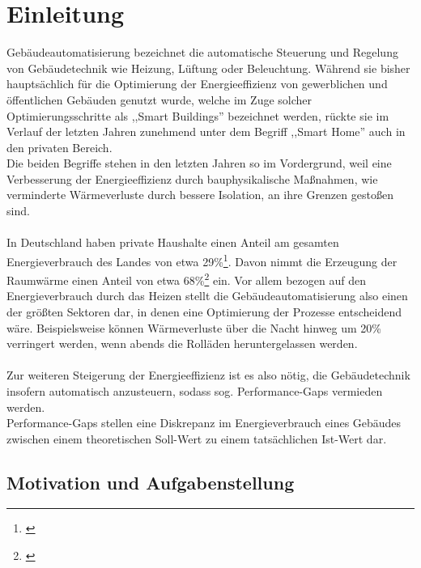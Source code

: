 \clearpage
\chapter{\textbf{Einleitung}}\label{einleitung}



Gebäudeautomatisierung bezeichnet die automatische Steuerung und Regelung von Gebäudetechnik 
wie Heizung, Lüftung oder Beleuchtung. Während sie bisher hauptsächlich für die Optimierung 
der Energieeffizienz von gewerblichen und öffentlichen Gebäuden genutzt wurde, welche im 
Zuge solcher Optimierungsschritte als ,,Smart Buildings'' bezeichnet werden, 
rückte sie im Verlauf der letzten Jahren zunehmend unter dem Begriff ,,Smart Home'' auch in den privaten 
Bereich.\\
Die beiden Begriffe stehen in den letzten Jahren so im Vordergrund, weil eine
Verbesserung der Energieeffizienz durch bauphysikalische Maßnahmen, wie verminderte 
Wärmeverluste durch bessere Isolation, an ihre Grenzen gestoßen sind.\\\\
In Deutschland haben private Haushalte einen Anteil am gesamten Energieverbrauch des Landes von 
etwa 29\%\footnote[1]{\cite{Umweltbundesamt1}}. Davon nimmt die Erzeugung der Raumwärme einen Anteil
von etwa 68\%\footnote[2]{\cite{Umweltbundesamt}} ein. Vor allem bezogen
auf den Energieverbrauch durch das Heizen stellt die Gebäudeautomatisierung also einen der größten
Sektoren dar, in denen eine Optimierung der Prozesse entscheidend wäre. Beispielsweise können Wärmeverluste
über die Nacht hinweg um 20\% verringert werden, wenn abends die Rolläden heruntergelassen werden.\\\\
Zur weiteren Steigerung der Energieeffizienz ist es also nötig, die Gebäudetechnik insofern
automatisch anzusteuern, sodass sog. Performance-Gaps vermieden werden.\\
Performance-Gaps stellen eine Diskrepanz im Energieverbrauch eines Gebäudes zwischen einem theoretischen 
Soll-Wert zu einem tatsächlichen Ist-Wert dar.\\


\section{Motivation und Aufgabenstellung}

